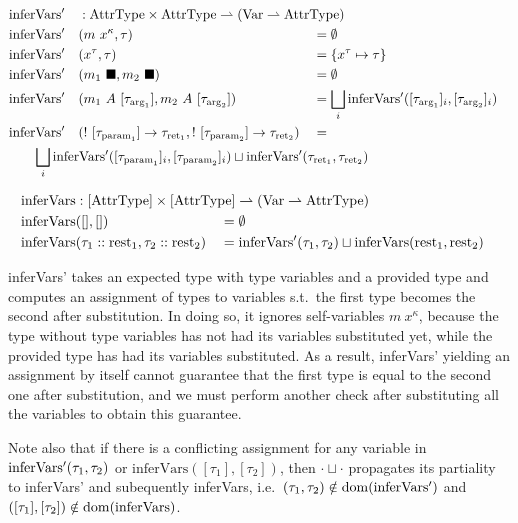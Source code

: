 \begin{alignat*}{3}
	&\inferVarsDash &&: \mathrlap{\AttrType \times \AttrType \rightharpoonup (\Var \rightharpoonup \AttrType)} \\
	&\inferVarsDash&&(m\ x^\kappa, \tau) &&= \emptyset \\
	&\inferVarsDash&&(x^\tau, \tau) &&= \{ x^\tau \mapsto \tau \} \\
	&\inferVarsDash&&(m_1\ \blacksquare, m_2\ \blacksquare) &&= \emptyset \\
	&\inferVarsDash&&(m_1\ A\ [\tau_{\arrg_1}], m_2\ A\ [\tau_{\arrg_2}]) &&= \bigsqcup_i \inferVarsDash([\tau_{\arrg_1}]_i, [\tau_{\arrg_2}]_i) \\
	&\inferVarsDash&&(!\ [\tau_{\param_1}] \to \tau_{\ret_1}, !\ [\tau_{\param_2}] \to \tau_{\ret_2}) &&= \\
	&\rebreak{\bigsqcup_i \inferVarsDash([\tau_{\param_1}]_i, [\tau_{\param_2}]_i) \sqcup \inferVarsDash(\tau_{\ret_1}, \tau_{\ret_2})}
\end{alignat*}

\newcommand{\inferVars}{\mathrm{inferVars}}

\begin{alignat*}{3}
	\inferVars &: \mathrlap{[\AttrType] \times [\AttrType] \rightharpoonup (\Var \rightharpoonup \AttrType)} \\
	\inferVars&([], []) &&= \emptyset \\
	\inferVars&(\tau_1 :: \rest_1, \tau_2 :: \rest_2) &&= \inferVarsDash(\tau_1, \tau_2) \sqcup \inferVars(\rest_1, \rest_2) \\
\end{alignat*}

inferVars' takes an expected type with type variables and a provided type and computes an assignment of types to variables s.t.\ the first type becomes the second after substitution. In doing so, it ignores self-variables $m\ x^\kappa$, because the type without type variables has not had its variables substituted yet, while the provided type has had its variables substituted. As a result, inferVars' yielding an assignment by itself cannot guarantee that the first type is equal to the second one after substitution, and we must perform another check after substituting all the variables to obtain this guarantee. 

Note also that if there is a conflicting assignment for any variable in $\mathrm{inferVars'}(\tau_1, \tau_2)$ or $\inferVars([\tau_1], [\tau_2])$, then $\cdot \sqcup \cdot$ propagates its partiality to inferVars' and subequently inferVars, i.e.\ $(\tau_1, \tau_2) \notin \mathrm{dom}(\mathrm{inferVars'})$ and $([\tau_1], [\tau_2]) \notin \dom(\inferVars)$.

